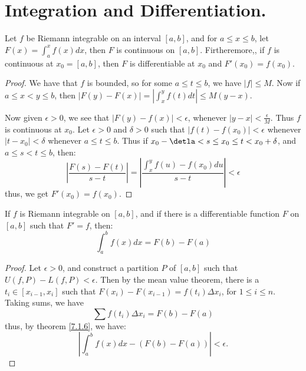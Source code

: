 
\section{Integration and Differentiation.}

\begin{theorem}\label{7.3.1}
    Let $f$ be Riemann integrable on an interval  $[a,b]$, and for  $a \leq x
    \leq b$, let  $F(x)=\int_{a}^{x}{f(x)}dx$, then  $F$ is continuous on
    $[a,b]$. Firtheremore,, if  $f$ is continuous at $x_0=[a,b]$, then $F$ is
    differentiable at  $ x_0$ and $F'(x_0)=f(x_0)$.
\end{theorem}
\begin{proof}
    We have that $f$ is bounded, so for some  $a \leq t \leq b$, we have  $|f|
    \leq M$. Now if  $a \leq x<y \leq b$, then  $|F(y)-F(x)|=|\int_{x}^{y}{f(t)}
    dt| \leq M(y-x)$.

    Now given $\epsilon>0$, we see that  $|F(y)-f(x)|<\epsilon$, whenever
    $|y-x|< \frac{\epsilon}{M}$. Thus $f$ is continuous at  $ x_0$. Let
    $\epsilon>0$ and  $\delta>0$ such that  $|f(t)-f(x_0)|<\epsilon$ whenever
    $|t-x_0|<\delta$ whenever $a \leq t \leq b$. Thus if  $ x_0-\detla<s \leq
    x_0 \leq t<x_0+\delta$, and $a \leq s<t \leq b$, then:
        \begin{equation*}
            |\frac{F(s)-F(t)}{s-t}|=|\frac{\int_{x}^{y}{f(u)-f(x_0)} du}{s-t}|<\epsilon		
        \end{equation*}
        thus, we get $F'(x_0)=f(x_0)$.
\end{proof}

\begin{theorem}\label{7.3.2}
    If $f$ is Riemann integrable on  $[a,b]$, and if there is a differentiable
    function  $F$ on  $[a,b]$ such that  $F'=f$, then:
        \begin{equation}
            \int_{a}^{b}{f(x)} dx=F(b)-F(a)		
        \end{equation}
\end{theorem}
\begin{proof}
    Let $\epsilon>0$, and construct a partition  $P$ of  $[a,b]$ such that
    $U(f,P)-L(f,P)<\epsilon$. Then by the mean value theorem, there is a  $t_i
    \in [x_{i-1},x_i]$ such that $F(x_i)-F(x_{i-1})=f(t_i) \Delta{x_i}$, for  $1
    \leq i \leq n$. Taking sums, we have
        \begin{equation}
            \sum{f(t_i) \Delta{x_i}}=F(b)-F(a)
        \end{equation}
    thus, by theorem \ref{7.1.6}, we have:
        \begin{equation*}
            |\int_{a}^{b}{f(x) dx}-(F(b)-F(a))|<\epsilon.		
        \end{equation*}
\end{proof}

